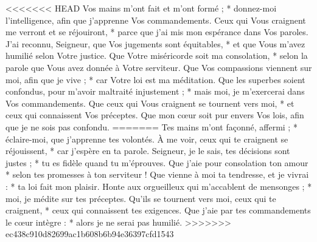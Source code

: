 <<<<<<< HEAD
Vos mains m'ont fait et m'ont formé ; * donnez-moi l'intelligence, afin que j'apprenne Vos commandements.
\versseparator
Ceux qui Vous craignent me verront et se réjouiront, * parce que j'ai mis mon espérance dans Vos paroles.
\versseparator
J'ai reconnu, Seigneur, que Vos jugements sont équitables, * et que Vous m'avez humilié selon Votre justice.
\versseparator
Que Votre miséricorde soit ma consolation, * selon la parole que Vous avez donnée à Votre serviteur.
\versseparator
Que Vos compassions viennent sur moi, afin que je vive ; * car Votre loi est ma méditation.
\versseparator
Que les superbes soient confondus, pour m'avoir maltraité injustement ; * mais moi, je m'exercerai dans Vos commandements.
\versseparator
Que ceux qui Vous craignent se tournent vers moi, * et ceux qui connaissent Vos préceptes.
\versseparator
Que mon cœur soit pur envers Vos lois, afin que je ne sois pas confondu.
=======
Tes mains m’ont façonné, affermi ; *
éclaire-moi, que j’apprenne tes volontés.
\versseparator
À me voir, ceux qui te craignent se réjouissent, *
car j’espère en ta parole.
\versseparator
Seigneur, je le sais, tes décisions sont justes ; *
tu es fidèle quand tu m’éprouves.
\versseparator
Que j’aie pour consolation ton amour *
selon tes promesses à ton serviteur !
\versseparator
Que vienne à moi ta tendresse, et je vivrai : *
ta loi fait mon plaisir.
\versseparator
Honte aux orgueilleux qui m’accablent de mensonges ; *
moi, je médite sur tes préceptes.
\versseparator
Qu’ils se tournent vers moi, ceux qui te craignent, *
ceux qui connaissent tes exigences.
\versseparator
Que j’aie par tes commandements le cœur intègre : *
alors je ne serai pas humilié.
>>>>>>> ec438c910d82699ac1b608b6b94e36397cfd1543
